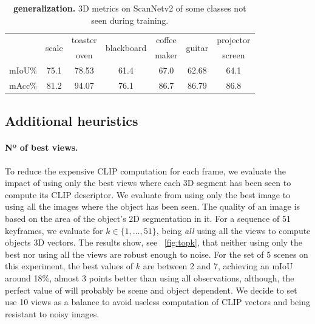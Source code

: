 \begin{table}[t]
\centering
    \small
    \setlength{\tabcolsep}{3pt} %
    \caption{\textbf{\clipours generalization.} 3D metrics on ScanNetv2 of some classes not seen during training.}\label{tab:miou_macc}  
\begin{tabular}{lcccccc}
\toprule
 & \multirow{2}{*}{scale} & toaster  & \multirow{2}{*}{blackboard} & coffee  & \multirow{2}{*}{guitar} & projector  \\ 
 &  & oven &  & maker &  &  screen \\ \hline
mIoU\% & 75.1 & 78.53 & 61.4 & 67.0 & 62.68 & 64.1 \\%
mAcc\% & 81.2 & 94.07 & 76.1 & 86.7 & 86.79 & 86.8 \\
\bottomrule
\end{tabular}
\end{table}
\subsection{Additional heuristics}
\paragraph{Nº of best views.}
To reduce the expensive CLIP computation for each frame, we evaluate the impact of using only the best views where each 3D segment has been seen to compute its CLIP descriptor.
We evaluate from using only the best image to using all the images where the object has been seen.
The quality of an image is based on the area of the object's 2D segmentation in it.
\newline
For a sequence of 51 keyframes, we evaluate for \(k\in\{1,\ldots,51\}\), being \textit{all} using all the views to compute objects 3D vectors. 
The results show, see ~\cref{fig:topk}, that neither using only the best nor using all the views are robust enough to noise. 
For the set of 5 scenes on this experiment, the best values of \(k\) are between 2 and 7, achieving an mIoU around 18\%, almost 3 points better than using all observations, although, the perfect value of will probably be scene and object dependent.
We decide to set use 10 views as a balance to avoid useless computation of CLIP vectors and being resistant to noisy images.
%
